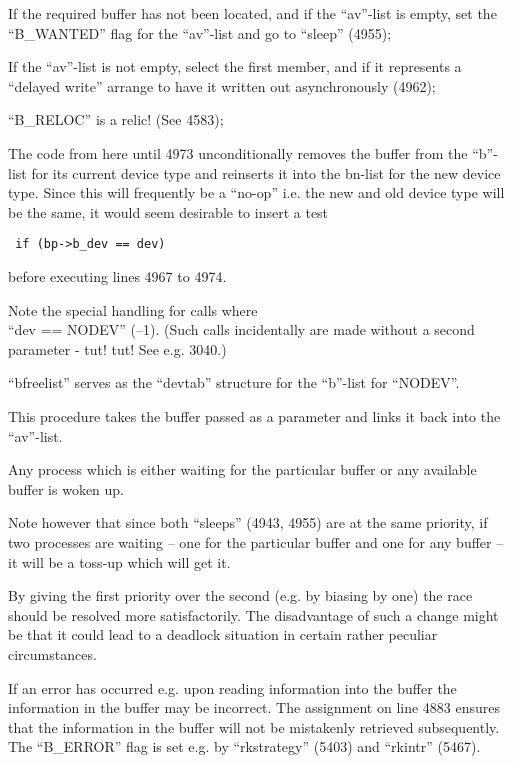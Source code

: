 \item[4953:] If the required buffer has not
been located, and if the
``av''-list is empty, set the
``B\_WANTED'' flag for the ``av''-list
and go to ``sleep'' (4955);

\item[4960:] If the ``av''-list is not empty,
 select the first member, and if
 it represents a ``delayed write''
 arrange to have it written out
 asynchronously (4962);

\item[4966:] ``B\_RELOC'' is a relic! (See 4583);

\item[4967:] The code from here until 4973
unconditionally removes the
buffer from the ``b''-list for its
current device type and reinserts
it into the bn-list for the new
device type. Since this will frequently be a ``no-op'' i.e. the new
and old device type will be the
same, it would seem desirable to
insert a test

\begin{verbatim}
 if (bp->b_dev == dev)
\end{verbatim}

\noindent before executing lines 4967 to
4974.

Note the special handling for calls where\\
``dev == NODEV'' (--1).
(Such calls incidentally are made
without a second parameter - tut!
tut! See e.g. 3040.)
\ed

``bfreelist'' serves as the ``devtab''
structure for the ``b''-list for ``NODEV''.


This procedure takes the buffer passed
as a parameter and links it back into
the ``av''-list.

Any process which is either waiting for
the particular buffer or any available
buffer is woken up.

Note however that since both ``sleeps''
(4943, 4955) are at the same priority,
if two processes are waiting -- one for
the particular buffer and one for any
buffer -- it will be a toss-up which
will get it.

By giving the first priority over the
second (e.g. by biasing by one) the
race should be resolved more satisfactorily. The disadvantage of such a
change might be that it could lead to a
deadlock situation in certain rather
peculiar circumstances.

If an error has occurred e.g. upon
reading information into the buffer
the information in the buffer may be
incorrect. The assignment on line 4883
ensures that the information in the
buffer will not be mistakenly retrieved
subsequently. The ``B\_ERROR'' flag is
set e.g. by ``rkstrategy'' (5403) and
``rkintr'' (5467).

